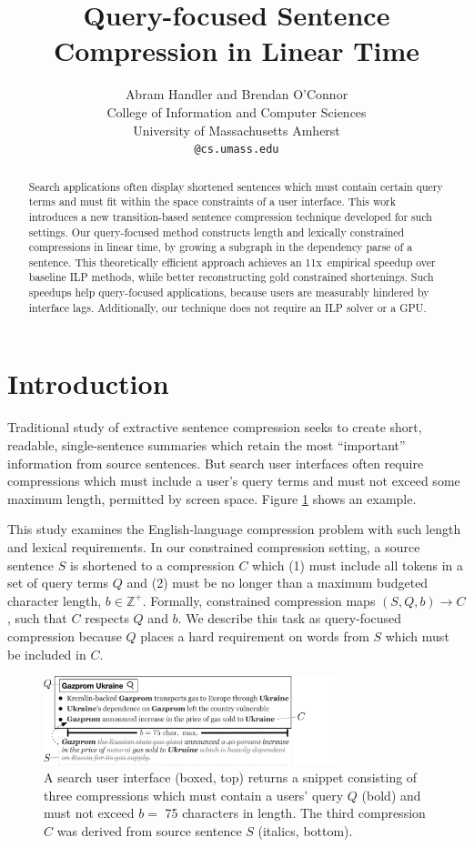 \documentclass[11pt,a4paper]{article}
\title{Query-focused Sentence Compression in Linear Time}
\author{Abram Handler {\normalfont and} Brendan O'Connor  \\
  College of Information and Computer Sciences \\
  University of Massachusetts Amherst \\ 
  {\tt \string{ahandler,brenocon\string}@cs.umass.edu} \\}
\date{}
\newcommand{\speedup}[0]{11x~}
\begin{document}
\maketitle
\begin{abstract}
Search applications often display shortened sentences which must contain certain query terms and must fit within the space constraints of a user interface. This work introduces a new transition-based sentence compression technique developed for such settings. Our query-focused method constructs length and lexically constrained compressions in linear time, by growing a subgraph in the dependency parse of a sentence. This theoretically efficient approach achieves an \speedup empirical speedup over baseline ILP methods, while better reconstructing gold constrained shortenings. Such speedups help query-focused applications, because users are measurably hindered by interface lags. Additionally, our technique does not require an ILP solver or a GPU.
\end{abstract}


\section{Introduction}\label{s:intro}

Traditional study of extractive sentence compression seeks to create short, readable, single-sentence summaries which retain the most ``important'' information from source sentences. But search user interfaces often require compressions which must include a user's query terms and must not exceed some maximum length, permitted by screen space.  Figure \ref{f:qf} shows an example.

This study examines the English-language compression problem with such length and lexical requirements. In our constrained compression setting, a source sentence $S$ is shortened to a compression $C$ which (1) must include all tokens in a set of query terms $Q$ and (2) must be no longer than a maximum budgeted character length, $b \in \mathbb{Z}^{+}$. Formally, constrained compression maps $(S,Q,b) \rightarrow C$, such that $C$ respects $Q$ and $b$. We describe this task as query-focused compression because $Q$ places a hard requirement on words from $S$ which must be included in $C$.

\begin{figure}[htb!]
\includegraphics[width=8.5cm]{qf.pdf}
\caption{A search user interface (boxed, top) returns a snippet consisting of three compressions which must contain a users' query $Q$ (bold) and must not exceed $b=$ 75 characters in length. The third compression $C$ was derived from source sentence $S$ (italics, bottom).}
\label{f:qf}
\end{figure}
\end{document}
